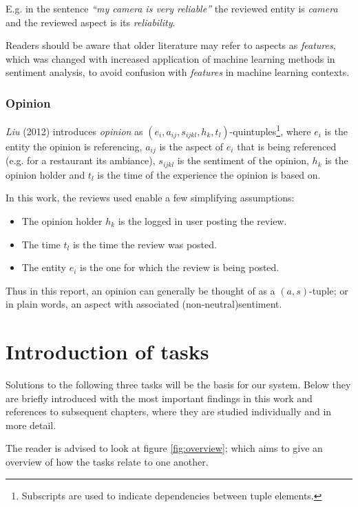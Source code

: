 \documentclass[a4paper,11pt]{kth-mag}
\begin{document}
E.g. in the sentence \emph{``my camera is very reliable''} the reviewed entity is \emph{camera} and the reviewed aspect is its \emph{reliability}.

Readers should be aware that older literature may refer to aspects as \emph{features}, which was changed with increased application of machine learning methods in sentiment analysis, to avoid confusion with \emph{features} in machine learning contexts.

\vspace{1cm}

\subsubsection{Opinion}
\emph{Liu} (2012) introduces \emph{opinion} as $(e_i,a_{ij},s_{ijkl},h_k,t_l)$-quintuples\footnote{Subscripts are
  used to indicate dependencies between tuple elements.},
where $e_i$ is the entity the opinion is referencing,
$a_{ij}$ is the aspect of $e_i$ that is being referenced (e.g. for a restaurant its ambiance),
$s_{ijkl}$ is the sentiment of the opinion,
$h_k$ is the opinion holder and
$t_l$ is the time of the experience the opinion is based on\cite[Chapter~2.1]{liu2012sentiment}.

In this work, the reviews used enable a few simplifying assumptions:
\begin{itemize}
\item The opinion holder $h_k$ is the logged in user posting the review.
\item The time $t_l$ is the time the review was posted.
\item The entity $e_i$ is the one for which the review is being posted.
\end{itemize}

Thus in this report, an opinion can generally be thought of as a $(a,s)$-tuple; or in plain words, an aspect with associated (non-neutral)sentiment.



\section{Introduction of tasks}
Solutions to the following three tasks will be the basis for our system.
Below they are briefly introduced with the most important findings in this work and references
to subsequent chapters, where they are studied individually and in more detail.

The reader is advised to look at figure \ref{fig:overview}; which aims to
give an overview of how the tasks relate to one another.
\end{document}
